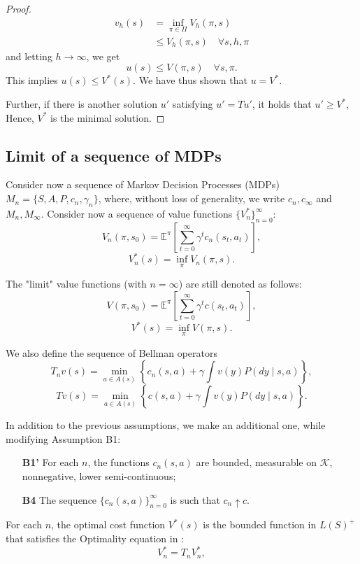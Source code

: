 \begin{proof}
\begin{align}
    v_h(s) &= \inf_{\pi \in \Pi} V_h(\pi, s)\\
    &\leq V_h(\pi, s) \quad \forall s,h,\pi
\end{align}
and letting \( h \to \infty \), we get
\[
u(s) \leq V(\pi, s) \quad \forall s,\pi.
\]
This implies \( u(s) \leq V^*(s) \). We have thus shown that \( u = V^* \).


Further, if there is another solution $u'$ satisfying $u'=Tu'$, it holds that $u'\geq V^{*}$, Hence, $V^{*}$ is the minimal solution.

\end{proof}


\subsection{Limit of a sequence of MDPs}

Consider now a sequence of Markov Decision Processes (MDPs) \( M_n = \{ S, A, P, c_n, \gamma_n \} \), where, without loss of generality, we write \( c_n, c_\infty \) and \( M_n, M_\infty \). Consider now a sequence of value functions \( \{ V_n^* \}_{n=0}^{\infty} \):
\[
V_n(\pi, s_0) = \mathbb{E}^\pi \left[ \sum_{t=0}^{\infty} \gamma^t c_n(s_t, a_t) \right],
\]
\[
V_n^*(s) = \inf_{\pi} V_n(\pi, s).
\]

The "limit" value functions (with \( n = \infty \)) are still denoted as follows:
\[
V(\pi, s_0) = \mathbb{E}^\pi \left[ \sum_{t=0}^{\infty} \gamma^t c(s_t, a_t) \right],
\]
\[
V^*(s) = \inf_{\pi} V(\pi, s).
\]

We also define the sequence of Bellman operators
\[
T_n v(s) = \min_{a \in A(s)} \left\{ c_n(s, a) + \gamma \int v(y) P(dy \mid s, a) \right\},
\]
\[
T v(s) = \min_{a \in A(s)} \left\{ c(s, a) + \gamma \int v(y) P(dy \mid s, a) \right\}.
\]

In addition to the previous assumptions, we make an additional one, while modifying Assumption B1:
\begin{itemize}
    \item[\textbf{B1'}] For each \( n \), the functions \( c_n(s, a) \) are bounded, measurable on \( \mathcal{K} \), nonnegative, lower semi-continuous;
    \item[\textbf{B4}] The sequence \( \{ c_n(s, a) \}_{n=0}^{\infty} \) is such that \( c_n \uparrow c \).
\end{itemize}
 


For each \( n \), the optimal cost function \( V^*(s) \) is the bounded function in \( L(S)^+ \) that satisfies the Optimality equation in  :
\[
V_n^* = T_n V_n^*,
\]

